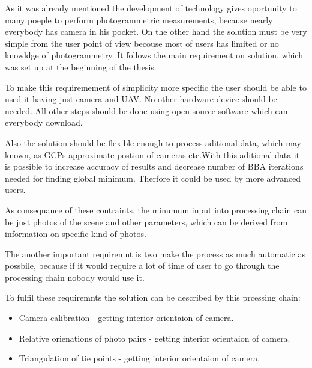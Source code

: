 \documentclass[a4paper,12pt]{report}
\begin{document}
  
As it was already mentioned the development of technology gives oportunity to many poeple
to perform photogrammetric measurements, because nearly everybody has camera in his pocket.
On the other hand the solution must be very simple from the user point of view becouse 
most of users has limited or no knowldge of photogrammetry. It follows the main requirement 
on solution, which was set up at the beginning of the thesis.

To make this requiremement of simplicity more specific the user should be able to used it having 
just camera and UAV. No other hardware device should be needed. All other steps should be done 
using open source software which can everybody download.

Also the solution should be flexible enough to process aditional data, which may known, 
as GCPs approximate postion of cameras etc.With this aditional data it is possible 
to increase accuracy of results and decrease number of  BBA iterations needed for finding 
global minimum. Therfore it could be used by more advanced users.

As consequance of these contraints, the minumum input into processing chain can be just photos
of the scene and other parameters, which can be derived from information on specific kind of photos.

The another important requiremnt is two make the process as much automatic as possbile, because 
if it would require a lot of time of user to go through the processing chain nobody would use it.

To fulfil these requiremnts the solution can be described by this prcessing chain:

\begin{itemize}
\item Camera calibration - getting interior orientaion of camera.
\item Relative orienations of photo pairs - getting interior orientaion of camera.
\item Triangulation of tie points - getting interior orientaion of camera.

\end{itemize}
\end{document}
